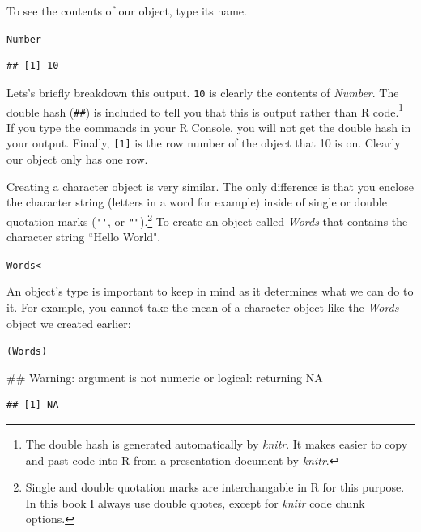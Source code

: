 \noindent To see the contents of our object, type its name.

\begin{knitrout}
\color{fgcolor}\begin{kframe}
\begin{alltt}
Number
\end{alltt}
\begin{verbatim}
## [1] 10
\end{verbatim}
\end{kframe}
\end{knitrout}


\noindent Lets's briefly breakdown this output. \texttt{10} is clearly the contents of {\emph{Number}}. The double hash (\texttt{\#\#}) is included to tell you that this is output rather than R code.\footnote{The double hash is generated automatically by {\emph{knitr}}. It makes easier to copy and past code into R from a presentation document by {\emph{knitr}}.} If you type the commands in your R Console, you will not get the double hash in your output. Finally, \texttt{[1]} is the row number of the object that 10 is on. Clearly our object only has one row.   

Creating a character object is very similar. The only difference is that you enclose the character string (letters in a word for example) inside of single or double quotation marks (\verb|''|, or \verb|""|).\footnote{Single and double quotation marks are interchangable in R for this purpose. In this book I always use double quotes, except for \emph{knitr} code chunk options.} To create an object called \emph{Words} that contains the character string ``Hello World".\label{StringObject}

\begin{knitrout}
\color{fgcolor}\begin{kframe}
\begin{alltt}
Words <- 
\end{alltt}
\end{kframe}
\end{knitrout}


An object's type is important to keep in mind as it determines what we can do to it. For example, you cannot take the mean of a character object like the {\emph{Words}} object we created earlier:

\begin{knitrout}
\color{fgcolor}\begin{kframe}
\begin{alltt}
(Words)
\end{alltt}


{\ttfamily\noindent\textcolor{warningcolor}{\#\# Warning: argument is not numeric or logical: returning NA}}\begin{verbatim}
## [1] NA
\end{verbatim}
\end{kframe}
\end{knitrout}


